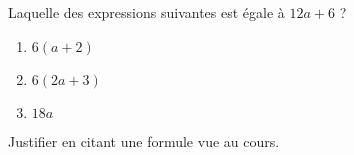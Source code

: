 
\begin{exercice}\label{exo2smath-0020}

    Laquelle des expressions suivantes est égale à \( 12a+6\) ?
    \begin{enumerate}
        \item
            \( 6(a+2)\)
        \item
            \( 6(2a+3)\)
        \item
            \( 18a\)
    \end{enumerate}
    Justifier en citant une formule vue au cours.

\end{exercice}
